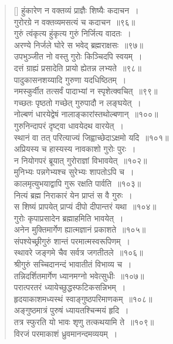 \documentclass[twoside,12pt,notitlepage]{book}
\begin{document}
\begin{verse}[\versewidth]
हुंकारेण न वक्तव्यं प्राज्ञैः शिष्यैः कदाचन~।\\[-6pt]
गुरोरग्रे न वक्तव्यमसत्यं च कदाचन~॥९६॥\\ 
गुरुं त्वंकृत्य हुंकृत्य गुरुं निर्जित्य वादतः~।\\[-6pt]
अरण्ये निर्जले घोरे स भवेद् ‍ब्रह्मराक्षसः~॥९७॥\\
उपभुञ्जीत नो वस्तु गुरोः किञ्चिदपि स्वयम्~।\\[-6pt]
दत्तं ग्राह्यं  प्रसादेति प्रायो ह्येतन्न लभ्यते~॥९८॥\\
पादुकासनशय्यादि गुरुणा यदधिष्ठितम्~।\\[-6pt]
नमस्कुर्वीत तत्सर्वं पादाभ्यां न स्पृशेत्क्वचित्~॥९९॥\\
गच्छतः पृष्ठतो गच्छेत् गुरुपादौ न लङ्घयेत्~।\\[-6pt]
नोल्बणं धारयेद्वेषं नालाङ्कारांस्तथोल्बणान्~॥१००॥\\
गुरुनिन्दापरं दृष्ट्वा धावयेदथ वारयेत्~।\\[-6pt]
स्थानं वा तत् परित्याज्यं जिह्वाच्छेदाऽक्षमो यदि~॥१०१॥\\
अप्रियस्य च हास्यस्य नावकाशो गुरोः पुरः~।\\[-6pt]
न नियोगपरं ब्रूयात् गुरोराज्ञां विभावयेत्~॥१०२॥\\
मुनिभ्यः पन्नगेभ्यश्च सुरेभ्यः शापतोऽपि च~।\\[-6pt]
कालमृत्युभयाद्वापि गुरू रक्षति पार्वति~॥१०३॥\\
नित्यं ब्रह्म निराकारं येन प्राप्तं स वै गुरुः~।\\[-6pt]
स शिष्यं प्रापयेत् प्राप्यं दीपो दीपान्तरं यथा~॥१०४॥\\
गुरोः कृपाप्रसादेन ब्रह्माहमिति भावयेत्~।\\[-6pt]
अनेन मुक्तिमार्गेण ह्यात्मज्ञानं प्रकाशते~॥१०५॥\\
संपश्येच्छ्रीगुरुं शान्तं परमात्मस्वरूपिणम्~।\\[-6pt]
स्थावरे जङ्गमे चैव सर्वत्र जगतीतले~॥१०६॥\\
श्रीगुरुं सच्चिदानन्दं भावातीतं विभाव्य च~।\\[-6pt]
तन्निदर्शितमार्गेण ध्यानमग्नो भवेत्सुधीः~॥१०७॥\\
परात्परतरं ध्यायेच्छुद्धस्फटिकसन्निभम्~।\\[-6pt]
हृदयाकाशमध्यस्थं स्वाङ्गुष्ठपरिमाणकम्~॥१०८॥\\
अङ्गुष्ठमात्रं पुरुषं ध्यायतश्चिन्मयं हृदि~।\\[-6pt]
तत्र स्फुरति यो भावः शृणु तत्कथयामि ते~॥१०९॥\\
विरजं परमाकाशं  ध्रुवमानन्दमव्ययम्~।\\[-6pt]

\end{verse}
\end{document}
